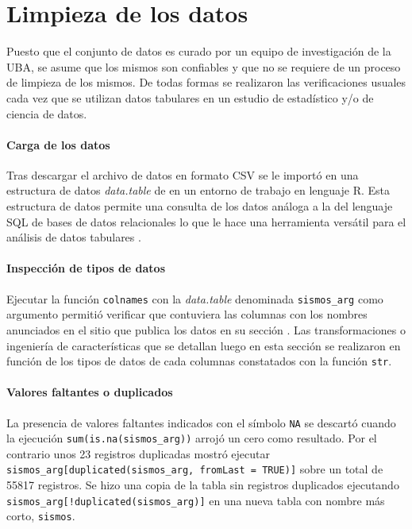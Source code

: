 \documentclass[a4paper]{report}
\begin{document}
\section{Limpieza de los datos}

Puesto que el conjunto de datos es curado por un equipo de investigación de la UBA, se asume que los mismos son confiables y que no se requiere de un proceso de limpieza de los mismos.
De todas formas se realizaron las verificaciones usuales cada vez que se utilizan datos tabulares en un estudio de estadístico y/o de ciencia de datos.

\paragraph{Carga de los datos}
Tras descargar el archivo de datos en formato CSV se le importó en una estructura de datos \emph{data.table} de en un entorno de trabajo en lenguaje R.
Esta estructura de datos permite una consulta de los datos análoga a la del lenguaje SQL de bases de datos relacionales lo que le hace una herramienta versátil para el análisis de datos tabulares \cite{noauthor_introduction_2024}.

\paragraph{Inspección de tipos de datos}
Ejecutar la función \verb'colnames' con la \emph{data.table} denominada \verb'sismos_arg' como argumento permitió verificar que contuviera las columnas con los nombres anunciados en el sitio que publica los datos en su sección \cite[Exploración inicial]{daniela_parada_ic-datasets-docencia_nodate}.
Las transformaciones o ingeniería de características que se detallan luego en esta sección se realizaron en función de los tipos de datos de cada columnas constatados con la función \verb'str'.


\paragraph{Valores faltantes o duplicados}
La presencia de valores faltantes indicados con el símbolo \verb'NA' se descartó cuando la ejecución \verb'sum(is.na(sismos_arg))' arrojó un cero como resultado.
Por el contrario unos \num{23} registros duplicadas mostró
ejecutar \verb'sismos_arg[duplicated(sismos_arg, fromLast = TRUE)]' sobre un total de \num{55817} registros.
Se hizo una copia de la tabla sin registros duplicados ejecutando \verb'sismos_arg[!duplicated(sismos_arg)]' en una nueva tabla con nombre más corto, \verb'sismos'.
\end{document}
